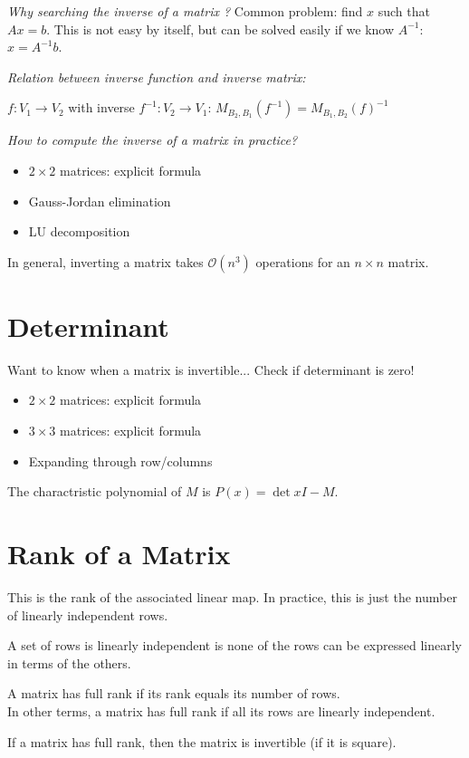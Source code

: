 \textit{Why searching the inverse of a matrix ?}
Common problem: find $x$ such that $Ax=b$. This is not easy by itself, but can be solved easily if we know $A^{-1}$: $x=A^{-1}b$.

\textit{Relation between inverse function and inverse matrix:}
\begin{property}
	$f:V_1 \to V_2$ with inverse $f^{-1}:V_2 \to V_1$:
	$M_{B_2,B_1}(f^{-1}) = M_{B_1,B_2}(f)^{-1}$
\end{property}

\textit{How to compute the inverse of a matrix in practice?}
\begin{itemize}
	\item $2 \times 2$ matrices: explicit formula
	\item Gauss-Jordan elimination
	\item LU decomposition
\end{itemize}

In general, inverting a matrix takes $\mathcal{O}(n^3)$ operations for an $n \times n$ matrix.
\section{Determinant}
Want to know when a matrix is invertible... Check if determinant is zero!
\begin{itemize}
	\item $2 \times 2$ matrices: explicit formula
	\item $3 \times 3$ matrices: explicit formula
	\item Expanding through row/columns
\end{itemize}
\begin{definition}
	The charactristic polynomial of $M$ is $P(x)=\det{xI-M}$.
\end{definition}


\section{Rank of a Matrix}
This is the rank of the associated linear map.
In practice, this is just the number of linearly independent rows.

\begin{definition}
	A set of rows is linearly independent is none of the rows can be expressed linearly in terms of the others.
\end{definition}
\begin{definition}
	A matrix has full rank if its rank equals its number of rows.\\
	In other terms, a matrix has full rank if all its rows are linearly independent.
\end{definition}
If a matrix has full rank, then the matrix is invertible (if it is square).

